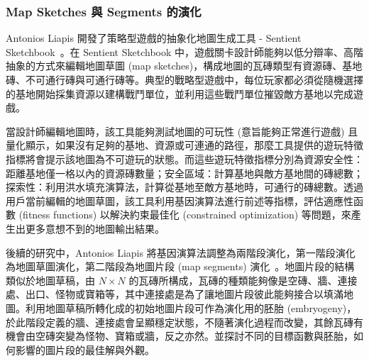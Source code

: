





\subsubsection{Map Sketches 與 Segments 的演化}
\label{sssec:relatedworks-proceduralgamepatterns-mapsketches}

Antonios Liapis 開發了策略型遊戲的抽象化地圖生成工具 - Sentient Sketchbook~\cite{liapis2013generating}。在 Sentient Sketchbook 中，遊戲關卡設計師能夠以低分辯率、高階抽象的方式來編輯地圖草圖 (map sketches)，構成地圖的瓦磚類型有資源磚、基地磚、不可通行磚與可通行磚等。典型的戰略型遊戲中，每位玩家都必須從隨機選擇的基地開始採集資源以建構戰鬥單位，並利用這些戰鬥單位摧毀敵方基地以完成遊戲。

當設計師編輯地圖時，該工具能夠測試地圖的可玩性 (意旨能夠正常進行遊戲) 且量化顯示，如果沒有足夠的基地、資源或可連通的路徑，那麼工具提供的遊玩特徵指標將會提示該地圖為不可遊玩的狀態。而這些遊玩特徵指標分別為資源安全性：距離基地僅一格以內的資源磚數量；安全區域：計算基地與敵方基地間的磚總數；探索性：利用洪水填充演算法，計算從基地至敵方基地時，可通行的磚總數。透過用戶當前編輯的地圖草圖，該工具利用基因演算法進行前述等指標，評估適應性函數 (fitness functions) 以解決約束最佳化 (constrained optimization) 等問題，來產生出更多意想不到的地圖輸出結果。

後續的研究中，Antonios Liapis 將基因演算法調整為兩階段演化，第一階段演化為地圖草圖演化，第二階段為地圖片段 (map segments) 演化~\cite{liapis2017multi}。地圖片段的結構類似於地圖草稿，由 $N\times N$ 的瓦磚所構成，瓦磚的種類能夠像是空磚、牆、連接處、出口、怪物或寶箱等，其中連接處是為了讓地圖片段彼此能夠接合以填滿地圖。利用地圖草稿所轉化成的初始地圖片段可作為演化用的胚胎 (embryogeny)，於此階段定義的牆、連接處會呈顯穩定狀態，不隨著演化過程而改變，其餘瓦磚有機會由空磚突變為怪物、寶箱或牆，反之亦然。並探討不同的目標函數與胚胎，如何影響的圖片段的最佳解與外觀。

